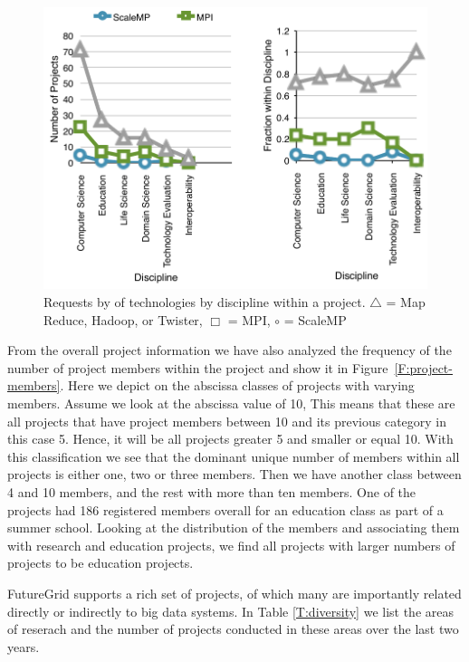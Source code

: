\documentclass[graybox]{svmult}
\begin{document}
\begin{figure}[p]
  \centering
    \includegraphics[width=.75\textwidth]{images/trend-b.pdf}
  \caption{Requests by of technologies by discipline within a
    project. $\bigtriangleup$ = Map Reduce, Hadoop, or Twister,
    $\Box$  = MPI, $\circ$ = ScaleMP}
   \label{F:trend-b}
\end{figure}


From the overall project information we have also analyzed the frequency of the number of project members within the project and show it in Figure~\ref{F:project-members}. Here we depict on the abscissa classes of projects with varying members.  Assume we look at the abscissa value of 10, This means that these are all projects that have project members between 10 and its previous category in this case 5. Hence, it will be all projects greater 5 and smaller or equal 10. With this classification we see that the dominant unique number of members within all projects is either one, two or three members. Then we have another class between 4 and 10 members, and the rest with more than ten members. One of the projects had 186 registered members overall for an education class as part of a summer school. Looking at the distribution of the members and associating them with research and education projects, we find all projects with larger numbers of projects to be education projects.


FutureGrid supports a rich set of projects, of which many are importantly related directly or indirectly to big data systems. In Table \ref{T:diversity} we list the areas of reserach and the number of projects conducted in these areas over the last two years.
\end{document}
